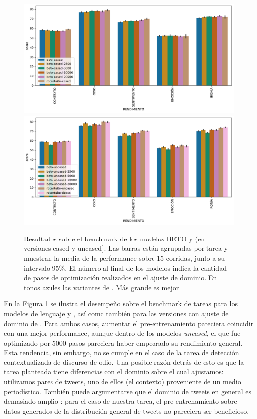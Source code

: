 \begin{figure}
    \centering
    \includegraphics[width=\textwidth]{img/robertuito/results_cased_models.pdf}
    \includegraphics[width=\textwidth]{img/robertuito/results_uncased_models.pdf}

    \caption{Resultados sobre el benchmark de los modelos BETO y \robertuito{} (en versiones cased y uncased). Las barras están agrupadas por tarea y muestran la media de la performance sobre 15 corridas, junto a su intervalo 95\%. El número al final de los modelos indica la cantidad de pasos de optimización realizados en el ajuste de dominio. En tonos azules las variantes de \robertuito{}. Más grande es mejor}
    \label{fig:robertuito_vs_domain_barplot_results}
\end{figure}


En la Figura \ref{fig:robertuito_vs_domain_barplot_results} se ilustra el desempeño sobre el benchmark de tareas para los modelos de lenguaje \beto{} y \robertuito{}, así como también para las versiones con ajuste de dominio de \beto{}. Para ambos casos, aumentar el pre-entrenamiento pareciera coincidir con una mejor performance, aunque dentro de los modelos \emph{uncased}, el que fue optimizado por \num{5000} pasos pareciera haber empeorado su rendimiento general. Esta tendencia, sin embargo, no se cumple en el caso de la tarea de detección contextualizada de discurso de odio. Una posible razón detrás de esto es que la tarea planteada tiene diferencias con el dominio sobre el cual ajustamos: utilizamos pares de tweets, uno de ellos (el contexto) proveniente de un medio periodístico. También puede argumentarse que el dominio de tweets en general es demasiado amplio \cite{eisenstein2013bad}: para el caso de nuestra tarea, el pre-entrenamiento sobre datos generados de la distribución general de tweets no pareciera ser beneficioso.

